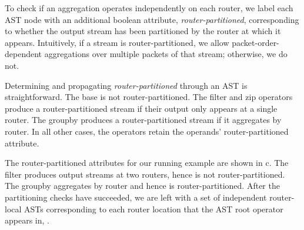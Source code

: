 To check if an aggregation operates independently on each router, we label each
AST node with an additional boolean attribute, {\em router-partitioned},
corresponding to whether the output stream has been partitioned by the router
at which it appears. Intuitively, if a stream is router-partitioned, we allow
packet-order-dependent aggregations over multiple packets of that stream;
otherwise, we do not.

Determining and propagating {\em router-partitioned} through an AST is
straightforward. The base {\ct \pktlog} is not router-partitioned. The {\ct
  filter} and {\ct zip} operators produce a router-partitioned stream if their
output only appears at a single router. The {\ct groupby} produces a
router-partitioned stream if it aggregates by {\ct router.} In all other cases,
the operators retain the operands' router-partitioned attribute.

The router-partitioned attributes for our running example are shown in
c. The {\ct filter} produces output streams at
two routers, hence is not router-partitioned. The {\ct groupby} aggregates by
{\ct router} and hence is router-partitioned. After the partitioning checks have
succeeded, we are left with a set of independent router-local ASTs corresponding
to each router location that the AST root operator appears in, .

